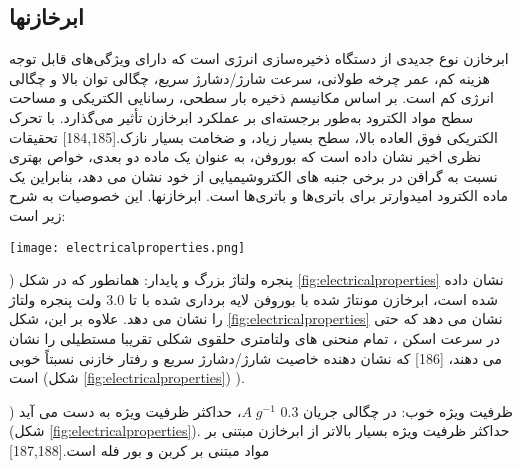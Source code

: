 \subsection{ابرخازنها}
ابرخازن نوع جدیدی از دستگاه ذخیره‌سازی انرژی است که دارای ویژگی‌های قابل توجه هزینه کم، عمر چرخه طولانی، سرعت شارژ/دشارژ سریع، چگالی توان بالا و چگالی انرژی کم است. بر اساس مکانیسم ذخیره بار سطحی، رسانایی الکتریکی و مساحت سطح مواد الکترود به‌طور برجسته‌ای بر عملکرد ابرخازن تأثیر می‌گذارد. با تحرک الکتریکی فوق العاده بالا، سطح بسیار زیاد، و ضخامت بسیار نازک.\cite{zhangBoropheneExtremelyHigh2016, zhanBoronSupercapacitors2016}[184,185] تحقیقات نظری اخیر نشان داده است که بوروفن، به عنوان یک ماده دو بعدی، خواص بهتری نسبت به گرافن در برخی جنبه های الکتروشیمیایی از خود نشان می دهد، بنابراین یک ماده الکترود امیدوارتر برای باتری‌ها و باتری‌ها است. ابرخازنها. این خصوصیات به شرح زیر است: 
\begin{figure*}
    \centering
    \texttt{[image: electricalproperties.png]}
    \caption{خواص الکتروشیمیایی ابرخازن مبتنی بر ورق B آماده شده الف) منحنی های ولتامتری چرخه ای که تحت ولتاژهای مختلف به دست می آیند. ب) منحنی های ولتامتری چرخه ای که تحت نرخ های مختلف اسکن جمع آوری شده اند. ج) منحنی های GCD تحت چگالی جریان های مختلف آزمایش شده اند. د) ظرفیت سلولی مربوطه (منحنی آبی) و ظرفیت خازنی ویژه (منحنی قرمز) تحت چگالی جریان های مختلف. ه) پایداری دوچرخه‌سواری برای 6000 سیکل (سرعت اسکن: 50 mV s-1). و) کرت های نایکیست در ابتدا و انتهای 6000 سیکل جمع آوری شد. ز) نمودار راگون در مایع یونی. باتری آماده شده می تواند به عنوان منبع تغذیه برای نور (h) و فن (i) استفاده شود. الف – من)}
    \label{fig:electricalproperties}
\end{figure*}
) پنجره ولتاژ بزرگ و پایدار: همانطور که در شکل \ref{fig:electricalproperties} نشان داده شده است، ابرخازن مونتاژ شده با بوروفن لایه برداری شده با  تا 3.0 ولت پنجره ولتاژ را نشان می دهد. علاوه بر این، شکل \ref{fig:electricalproperties} نشان می دهد که حتی در سرعت اسکن ، تمام منحنی های ولتامتری حلقوی شکلی تقریبا مستطیلی را نشان می دهند، \cite{luHTiO2MnO2HTiO22013}[186] که نشان دهنده خاصیت شارژ/دشارژ سریع و رفتار خازنی نسبتاً خوبی است (شکل \ref{fig:electricalproperties}) ). 

) ظرفیت ویژه خوب: در چگالی جریان 0.3 $A\; g^{-1}$، حداکثر ظرفیت ویژه  به دست می آید (شکل \ref{fig:electricalproperties}). حداکثر ظرفیت ویژه بسیار بالاتر از ابرخازن مبتنی بر مواد مبتنی بر کربن و بور فله است.[187\cite{liuElectrochemicalBehaviorGraphene2011, chenHighPerformanceSupercapacitors2011},188] 

